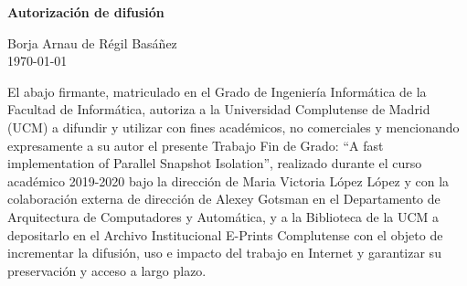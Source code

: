 \newpage
\thispagestyle{empty}
\begin{center}
   {\bf \Huge Autorización de difusión}
   \vspace{1cm}

   \large Borja Arnau de Régil Basáñez\\
   \vspace{0.5cm}
   \today\\
   \vspace{0.5cm}
\end{center}

El abajo firmante, matriculado en el Grado de Ingeniería Informática de la Facultad de Informática, autoriza a la Universidad Complutense de Madrid (UCM) a difundir y utilizar con fines académicos, no comerciales y mencionando expresamente a su autor el presente Trabajo Fin de Grado: ``A fast implementation of Parallel Snapshot Isolation'', realizado durante el curso académico 2019-2020 bajo la dirección de Maria Victoria López López y con la colaboración externa de dirección de Alexey Gotsman en el Departamento de Arquitectura de Computadores y Automática, y a la Biblioteca de la UCM a depositarlo en el Archivo Institucional E-Prints Complutense con el objeto de incrementar la difusión, uso e impacto del trabajo en Internet y garantizar su preservación y acceso a largo plazo.

